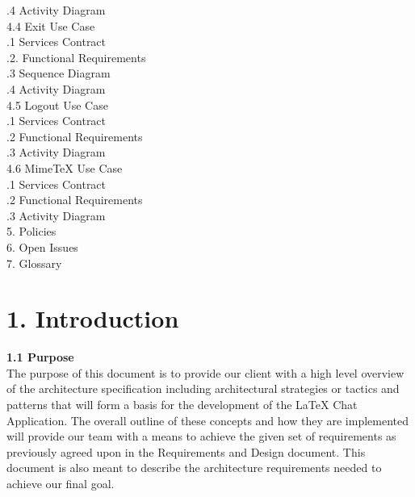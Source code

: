 \documentclass[29pt,a4paper]{moderncv}
\begin{document}
\begin{tabbing}
.4 Activity Diagram \\
4.4 Exit Use Case \> \\
.1 Services Contract \\
.2. Functional Requirements \\
.3 Sequence Diagram \\
.4 Activity Diagram \\
4.5 Logout Use Case \> \\
.1 Services Contract \\
.2 Functional Requirements  \\
.3 Activity Diagram \\
4.6 MimeTeX Use Case \> \\
.1 Services Contract \\
.2 Functional Requirements  \\
.3 Activity Diagram \\
5. Policies \> 			\\					
6. Open Issues \> 			\\				
7. Glossary \> 			\\				

\end{tabbing}
\newpage
	\section*{\textbf{1. Introduction}}
	\vspace{4mm}
	
		\textbf{1.1 Purpose}
			\\The purpose of this document is to provide our client with a high level overview of the architecture specification including architectural strategies or tactics and patterns that will form a basis for the development of the LaTeX Chat Application. The overall outline of these concepts and how they are implemented will provide our team with a means to achieve the given set of requirements as previously agreed upon in the Requirements and Design document. This document is also meant to describe the architecture requirements needed to achieve our final goal.\\
		\vspace{1mm}
		
\end{document}
